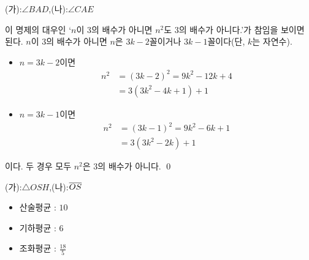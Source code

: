 \documentclass{oblivoir}
\begin{document}
\begin{multicols*}{2}
%
\begin{enumerate}
\end{enumerate}

%
(가)\::\:\(\angle BAD\),\quad (나)\::\:\(\angle CAE\)

%
이 명제의 대우인 `\(n\)이 \(3\)의 배수가 아니면 \(n^2\)도 \(3\)의 배수가 아니다.’가 참임을 보이면 된다.
\(n\)이 \(3\)의 배수가 아니면 \(n\)은 \(3k-2\)꼴이거나 \(3k-1\)꼴이다(단, \(k\)는 자연수).
\begin{itemize}
\item
\(n=3k-2\)이면 
\begin{align*}
n^2
&=(3k-2)^2=9k^2-12k+4\\
&=3(3k^2-4k+1)+1
\end{align*}
\item
\(n=3k-1\)이면 
\begin{align*}
n^2
&=(3k-1)^2=9k^2-6k+1\\
&=3(3k^2-2k)+1
\end{align*}
\end{itemize}
이다. 두 경우 모두 \(n^2\)은 \(3\)의 배수가 아니다.
\qed

%
(가)\::\:\(\triangle OSH\),\quad (나)\::\:\(\overline{OS}\)

%
\begin{itemize}
\item
산술평균 : \(10\)
\item
기하평균 : \(6\)
\item
조화평균 : \(\frac{18}5\)
\end{itemize}
\end{multicols*}

\end{document}
